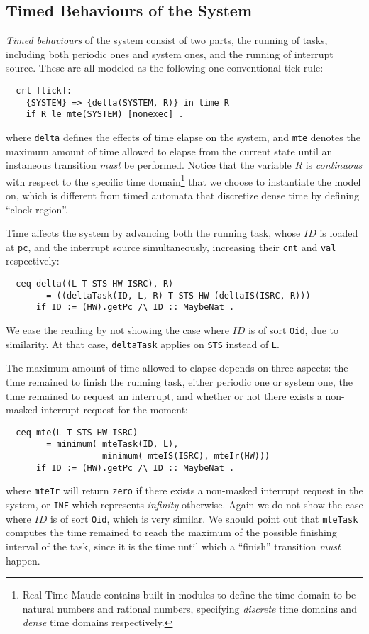 \documentclass{llncs}
\begin{document}
\subsection{Timed Behaviours of the System}
\emph{Timed behaviours} of the system consist of two parts, the
running of tasks, including both periodic ones and system ones, and
the running of interrupt source. These are all modeled as the
following one conventional tick rule:
\begin{verbatim}
  crl [tick]:
    {SYSTEM} => {delta(SYSTEM, R)} in time R 
    if R le mte(SYSTEM) [nonexec] .
\end{verbatim}
where \verb|delta| defines the effects of time elapse on the system,
and \verb|mte| denotes the maximum amount of time allowed to elapse
from the current state until an instaneous transition \emph{must} be
performed. Notice that the variable $R$ is \emph{continuous} with
respect to the specific time domain\footnote{Real-Time Maude contains
  built-in modules to define the time domain to be natural numbers and
  rational numbers, specifying \emph{discrete} time domains and
  \emph{dense} time domains respectively.}  that we choose to
instantiate the model on, which is different from timed automata that
discretize dense time by defining ``clock region''.

Time affects the system by advancing both the running task, whose $ID$
is loaded at \verb|pc|, and the interrupt source simultaneously,
increasing their \verb|cnt| and \verb|val| respectively:
\begin{verbatim}
  ceq delta((L T STS HW ISRC), R)
        = ((deltaTask(ID, L, R) T STS HW (deltaIS(ISRC, R)))
      if ID := (HW).getPc /\ ID :: MaybeNat .
\end{verbatim}
We ease the reading by not showing the case where $ID$ is of sort
\verb|Oid|, due to similarity. At that case, \verb|deltaTask| applies
on \verb|STS| instead of \verb|L|.

The maximum amount of time allowed to elapse depends on three aspects:
the time remained to finish the running task, either periodic one or
system one, the time remained to request an interrupt, and whether or
not there exists a non-masked interrupt request for the moment:
\begin{verbatim}
  ceq mte(L T STS HW ISRC)
        = minimum( mteTask(ID, L),
                   minimum( mteIS(ISRC), mteIr(HW)))
      if ID := (HW).getPc /\ ID :: MaybeNat .
\end{verbatim}
where \verb|mteIr| will return \verb|zero| if there exists a
non-masked interrupt request in the system, or \verb|INF| which
represents \emph{infinity} otherwise. Again we do not show the case
where $ID$ is of sort \verb|Oid|, which is very similar. We should
point out that \verb|mteTask| computes the time remained to reach the
maximum of the possible finishing interval of the task, since it is
the time until which a ``finish'' transition \emph{must} happen.
\end{document}
